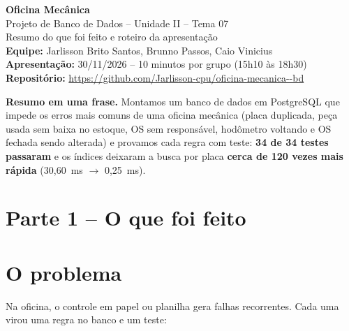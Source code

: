 \documentclass[a4paper,11pt]{article}
\begin{document}
\begin{center}
{\color{azul}\Huge\bfseries Oficina Mecânica}\\[4pt]
{\Large Projeto de Banco de Dados -- Unidade II -- Tema 07}\\[10pt]
{\large Resumo do que foi feito e roteiro da apresentação}\\[10pt]
\textbf{Equipe:} Jarlisson Brito Santos, Brunno Passos, Caio Vinicius\\[2pt]
\textbf{Apresentação:} 30/11/2026 -- 10 minutos por grupo (15h10 às 18h30)\\[2pt]
\textbf{Repositório:} \url{https://github.com/Jarlisson-cpu/oficina-mecanica--bd}
\end{center}

\vspace{4pt}
\tableofcontents
\vspace{6pt}

\begin{caixa}
\textbf{Resumo em uma frase.} Montamos um banco de dados em PostgreSQL que
impede os erros mais comuns de uma oficina mecânica (placa duplicada, peça
usada sem baixa no estoque, OS sem responsável, hodômetro voltando e OS fechada
sendo alterada) e provamos cada regra com teste: \textbf{34 de 34 testes
passaram} e os índices deixaram a busca por placa \textbf{cerca de 120 vezes mais
rápida} (30,60~ms $\rightarrow$ 0,25~ms).
\end{caixa}

\newpage
\section*{Parte 1 -- O que foi feito}

\section{O problema}
Na oficina, o controle em papel ou planilha gera falhas recorrentes. Cada
uma virou uma regra no banco e um teste:
\end{document}
